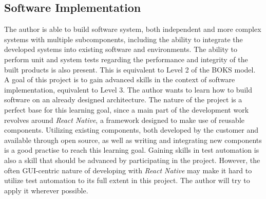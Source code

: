 \subsection{Software Implementation}
\label{ssec:implementation}

The author is able to build software system, both independent and more complex systems with multiple subcomponents, including the ability to integrate the developed systems into existing software and environments. The ability to perform unit and system tests regarding the performance and integrity of the built products is also present. This is equivalent to Level 2 of the BOKS model.
\newline
A goal of this project is to gain advanced skills in the context of software implementation, equivalent to Level 3. The author wants to learn how to build software on an already designed architecture. The nature of the project is a perfect base for this learning goal, since a main part of the development work revolves around \textit{React Native}, a framework designed to make use of reusable components. Utilizing existing components, both developed by the customer and available through open source, as well as writing and integrating new components is a good practise to reach this learning goal. Gaining skills in test automation is also a skill that should be advanced by participating in the project. However, the often GUI-centric nature of developing with \textit{React Native} may make it hard to utilize test automation to its full extent in this project. The author will try to apply it wherever possible.